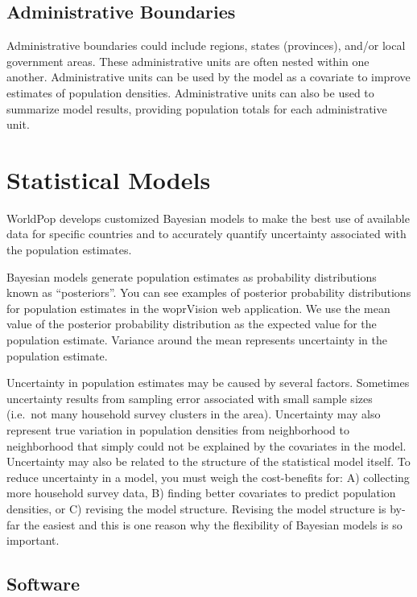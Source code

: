 \documentclass[]{book}
\begin{document}
\subsection{Administrative Boundaries}\label{administrative-boundaries}

Administrative boundaries could include regions, states (provinces),
and/or local government areas. These administrative units are often
nested within one another. Administrative units can be used by the model
as a covariate to improve estimates of population densities.
Administrative units can also be used to summarize model results,
providing population totals for each administrative unit.

\section{Statistical Models}\label{statistical-models}

WorldPop develops customized Bayesian models to make the best use of
available data for specific countries and to accurately quantify
uncertainty associated with the population estimates.

Bayesian models generate population estimates as probability
distributions known as ``posteriors''. You can see examples of posterior
probability distributions for population estimates in the woprVision web
application. We use the mean value of the posterior probability
distribution as the expected value for the population estimate. Variance
around the mean represents uncertainty in the population estimate.

Uncertainty in population estimates may be caused by several factors.
Sometimes uncertainty results from sampling error associated with small
sample sizes (i.e.~not many household survey clusters in the area).
Uncertainty may also represent true variation in population densities
from neighborhood to neighborhood that simply could not be explained by
the covariates in the model. Uncertainty may also be related to the
structure of the statistical model itself. To reduce uncertainty in a
model, you must weigh the cost-benefits for: A) collecting more
household survey data, B) finding better covariates to predict
population densities, or C) revising the model structure. Revising the
model structure is by-far the easiest and this is one reason why the
flexibility of Bayesian models is so important.

\subsection{Software}\label{software}
\end{document}
